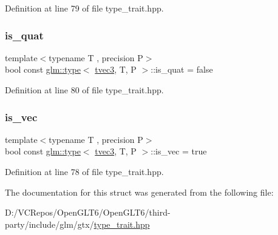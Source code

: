 Definition at line 79 of file type\+\_\+trait.\+hpp.

\mbox{\label{structglm_1_1type_3_01tvec3_00_01_t_00_01_p_01_4_a6650d3af422d07f8b071c19dd59bd173}} 
\subsubsection{\texorpdfstring{is\_quat}{is\_quat}}
{\footnotesize\ttfamily template$<$typename T , precision P$>$ \\
bool const \mbox{\hyperlink{structglm_1_1type}{glm\+::type}}$<$ \mbox{\hyperlink{structglm_1_1tvec3}{tvec3}}, T, P $>$\+::is\+\_\+quat = false\hspace{0.3cm}{\ttfamily [static]}}



Definition at line 80 of file type\+\_\+trait.\+hpp.

\mbox{\label{structglm_1_1type_3_01tvec3_00_01_t_00_01_p_01_4_a6932aaf64b066720cdf04b0675e21ef0}} 
\subsubsection{\texorpdfstring{is\_vec}{is\_vec}}
{\footnotesize\ttfamily template$<$typename T , precision P$>$ \\
bool const \mbox{\hyperlink{structglm_1_1type}{glm\+::type}}$<$ \mbox{\hyperlink{structglm_1_1tvec3}{tvec3}}, T, P $>$\+::is\+\_\+vec = true\hspace{0.3cm}{\ttfamily [static]}}



Definition at line 78 of file type\+\_\+trait.\+hpp.



The documentation for this struct was generated from the following file\+:\begin{DoxyCompactItemize}
\item 
D\+:/\+V\+C\+Repos/\+Open\+G\+L\+T6/\+Open\+G\+L\+T6/third-\/party/include/glm/gtx/\mbox{\hyperlink{type__trait_8hpp}{type\+\_\+trait.\+hpp}}\end{DoxyCompactItemize}
